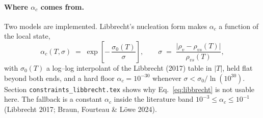 \paragraph{Where $\alpha_c$ comes from.}
Two models are implemented. Libbrecht's nucleation form makes $\alpha_c$ a
function of the local state,
%
\begin{equation}
  \alpha_c(T,\sigma) \;=\; \exp\!\left[-\,\frac{\sigma_0(T)}{\sigma}\right],
  \qquad
  \sigma \;=\; \frac{\lvert \rho_v - \rho_{vs}(T)\rvert}{\rho_{vs}(T)},
  \label{eq:libbrecht}
\end{equation}
%
with $\sigma_0(T)$ a log--log interpolant of the Libbrecht (2017) table in
$\lvert T \rvert$, held flat beyond both ends, and a hard floor
$\alpha_c = 10^{-30}$ whenever $\sigma < \sigma_0/\ln(10^{30})$.
Section \texttt{constraints\_libbrecht.tex} shows why
Eq.~\eqref{eq:libbrecht} is not usable here. The fallback is a constant
$\alpha_c$ inside the literature band $10^{-3} \le \alpha_c \le 10^{-1}$
(Libbrecht 2017; Braun, Fourteau \& L\"owe 2024).
